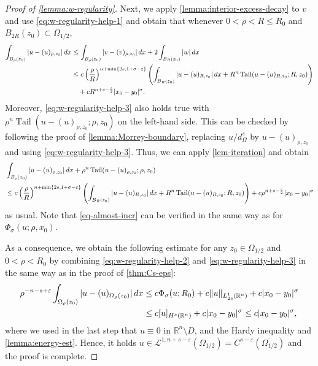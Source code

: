 \documentclass[11pt,reqno]{amsart}
\theoremstyle{plain}
\theoremstyle{definition}
\numberwithin{equation}{section}
\newcommand{\R}{\mathbb{R}}
\newcommand{\eps}{\varepsilon}
\newcommand{\1}{\mathbbm{1}}
\DeclareMathOperator{\tail}{Tail}
\renewcommand{\d}{\textnormal{\,d}}
\begin{document}
\begin{proof}[Proof of \autoref{lemma:w-regularity}]
Next, we apply \autoref{lemma:interior-excess-decay} to $v$ and use \eqref{eq:w-regularity-help-1} and obtain that whenever $0 < \rho < R\leq R_0$ and $B_{2R}(z_0) \subset \Omega_{1/2}$,
\begin{align}
\label{eq:w-regularity-help-3}
\begin{split}
\int_{B_{\rho}(z_0)} |u - (u)_{\rho,z_0}| \d x
&\leq \int_{B_{\rho}(z_0)} |v - (v)_{\rho,z_0}| \d x + 2\int_{B_R(z_0)} |w| \d x \\
&\le c \left( \frac{\rho}{R} \right)^{n+\min\{2s, 1+\sigma-\varepsilon\}} \left( \int_{B_{R}(z_0)} |u - (u)_{R,z_0}| \d x + R^{n}\tail(u - (u)_{R,z_0}; R,z_0) \right) \\
&\quad + c R^{n+s-\frac{\eps}{2}} |x_0 - y_0|^{\sigma}.
\end{split}
\end{align}
Moreover, \eqref{eq:w-regularity-help-3} also holds true with $\rho^{n}\tail(u - (u)_{\rho,z_0}; \rho,z_0)$ on the left-hand side. This can be checked by following the proof of \autoref{lemma:Morrey-boundary}, replacing $u/d_{\Omega}^s$ by $u - (u)_{\rho,z_0}$ and using \eqref{eq:w-regularity-help-3}. Thus, we can apply \autoref{lem-iteration} and obtain
\begin{align*}
& \int_{B_{\rho}(z_0)} |u - (u)_{\rho,z_0}| \d x + \rho^{n}\tail(u - (u)_{\rho,z_0}; \rho,z_0)  \\
& \le c \left( \frac{\rho}{R} \right)^{n+\min\{2s, 1+\sigma-\varepsilon\}} \left( \int_{B_{R}(z_0)} |u - (u)_{R,z_0}| \d x + R^{n}\tail(u - (u)_{R,z_0}; R,z_0) \right) + c \rho^{n+s-\frac{\eps}{2}} |x_0 - y_0|^{\sigma}
\end{align*}
as usual. Note that \eqref{eq-almost-incr} can be verified in the same way as for $\Phi_{\sigma}(u;\rho,x_0)$.

As a consequence, we obtain the following estimate for any $z_0 \in \Omega_{1/2}$ and $0 < \rho < R_0$ by combining \eqref{eq:w-regularity-help-2} and \eqref{eq:w-regularity-help-3} in the same way as in the proof of \autoref{thm:Cs-eps}:
\begin{align*}
\rho^{-n-s+\varepsilon} \int_{\Omega_{\rho}(z_0)} |u-(u)_{\Omega_{\rho}(z_0)}| \d x
&\le c \Phi_{\sigma}(u; R_0) + c\|u\|_{L^1_{2s}(\R^n)} + c |x_0 - y_0|^{\sigma} \\
&\le c [u]_{H^s(\R^n)} + c |x_0 - y_0|^{\sigma} \le c|x_0 - y_0|^{\sigma},
\end{align*}
where we used in the last step that $u \equiv 0$ in $\R^n \setminus D$, and the  Hardy inequality and \autoref{lemma:energy-est}.
Hence, it holds $u \in \mathcal{L}^{1,n+s-\eps}(\Omega_{1/2}) = C^{s-\eps}(\overline{\Omega_{1/2}})$ and the proof is complete.
\end{proof}
\end{document}
